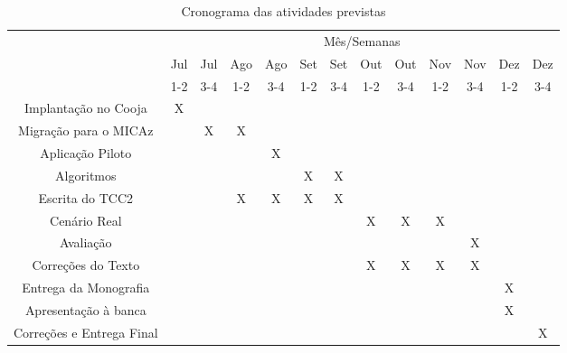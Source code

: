 \begin{table}[!htpb]
\centering
\begin{small}
  \setlength{\tabcolsep}{3pt}
\begin{tabular}{|c|c|c|c|c|c|c|c|c|c|c|c|c|}\hline
 & \multicolumn{12}{c|}{Mês/Semanas}\\ \cline{2-13}
\raisebox{1.5ex}{Etapa} & Jul & Jul & Ago & Ago & Set & Set & Out & Out & Nov & Nov & Dez & Dez \\ 
                        & 1-2 & 3-4 & 1-2 & 3-4 & 1-2 & 3-4 & 1-2 & 3-4 & 1-2 & 3-4 & 1-2 & 3-4 \\\hline


Implantação no Cooja      & X & & & & & & & & & & & \\ \hline
Migração para o MICAz     & & X & X & & & & & & & & & \\ \hline
Aplicação Piloto          & & & & X & & & & & & & & \\ \hline
Algoritmos                & & & & & X & X & & & & & & \\ \hline
Escrita do TCC2           & & & X & X & X & X &  & & & & &  \\ \hline
Cenário Real              & & & & & & & X & X & X & & &  \\ \hline
Avaliação                 & & & & & & & & & & X & &  \\ \hline
Correções do Texto        & & & & & & & X & X & X & X & &  \\ \hline
Entrega da Monografia     & & & & & & & & & & & X &  \\ \hline
Apresentação à banca      & & & & & & & & & & & X &  \\ \hline
Correções e Entrega Final & & & & & & & & & & & & X \\ \hline

\end{tabular} 
\end{small}
\caption{Cronograma das atividades previstas}
\label{t_cronograma}
\end{table} 
